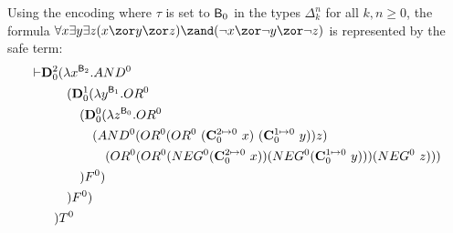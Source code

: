 %
\begin{example}
Using the encoding where $\tau$ is set to  $\mathsf{B}_0$ in the types $\Delta_k^n$ for all $k,n\geq 0$, the formula $\forall x \exists y \exists z (x\zor y\zor z)\zand(\neg x\zor \neg y\zor \neg z)$ is represented by the safe term:
\begin{align*}
\vdash &\mathbf{D}_0^2(\lambda x^{\mathsf{B}_2}. AND^0\\
&\quad\quad (\mathbf{D}_0^1(\lambda y^{\mathsf{B}_1}.OR^0\\
&\quad\quad\quad (\mathbf{D}_0^0(\lambda z^{\mathsf{B}_0}.OR^0\\
&\quad\quad\quad\quad (AND^0 (OR^0(OR^0~(\mathbf{C}_0^{2\mapsto 0}~x)~(\mathbf{C}_0^{1\mapsto 0}~y))z) \\
&\quad\quad\quad\quad\quad (OR^0(OR^0(NEG^0 (\mathbf{C}_0^{2\mapsto 0}~x))(NEG^0 (\mathbf{C}_0^{1\mapsto 0}~y)))(NEG^0~z))) \\
&\quad\quad\quad )F^0)\\
&\quad\quad)F^0)\\
&\quad) T^0
\end{align*}
\end{example}

